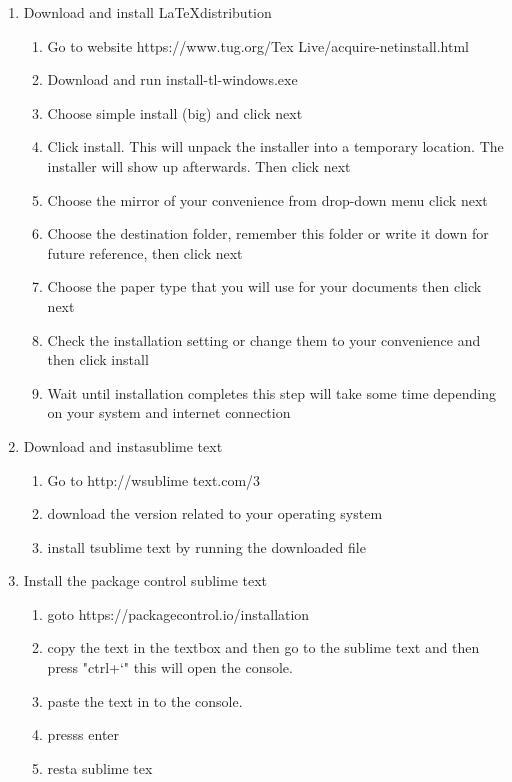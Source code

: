 \documentclass{memoir}
\begin{document}
\begin{enumerate}  
  \item Download and install \LaTeX  distribution
\begin{enumerate}
  \item Go to website https://www.tug.org/Tex Live/acquire-netinstall.html 
  \item Download and run install-tl-windows.exe
  \item Choose simple install (big) and click next
  \item Click install. This will unpack the installer into a temporary location. The installer will show up afterwards. Then click next
  \item Choose the mirror of your convenience from drop-down menu click next
  \item Choose the destination folder, remember this folder or write it down for future reference, then click next
  \item Choose the paper type that you will use for your documents then click next
  \item Check the installation setting or change them to your convenience and then click install
  \item Wait until installation completes this step will take some time depending on your system and internet connection
\end{enumerate}
\item Download and instasublime text
\begin{enumerate}
  \item Go to http://wsublime text.com/3
  \item download the version related to your operating system
  \item install tsublime text by running the downloaded file

\end{enumerate}
  \item Install the package control sublime text
  \begin{enumerate}
    \item goto https://packagecontrol.io/installation
    \item copy the text in the textbox and then go to the sublime text and then press "ctrl+`" this will open the console.
    \item paste the text in to the console.
    \item presss enter
    \item resta sublime tex  
  \end{enumerate}
  

\end{enumerate}
\end{document}
